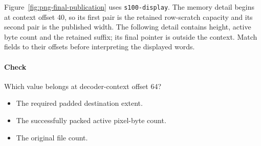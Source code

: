 Figure~\ref{fig:png-final-publication} uses \texttt{s100-display}. The memory
detail begins at context offset 40, so its first pair is the retained row-scratch
capacity and its second pair is the published width. The following detail contains
height, active byte count and the retained suffix; its final pointer is outside the
context. Match fields to their offsets before interpreting the displayed words.


\clearpage

\paragraph{Check} Which value belongs at decoder-context offset 64?
\begin{itemize}
  \item[A.] The required padded destination extent.
  \item[B.] The successfully packed active pixel-byte count.
  \item[C.] The original file count.
\end{itemize}
